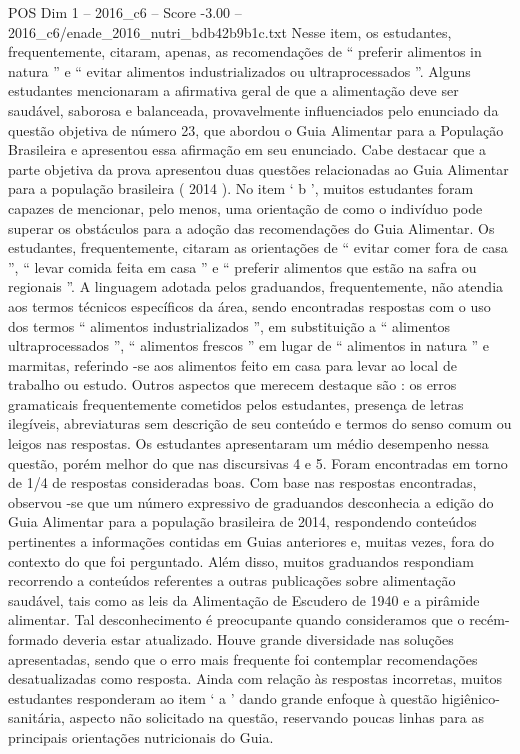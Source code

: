 \begin{textsample}{POS Dim 1 – 2016\_c6 – Score -3.00 – 2016\_c6/enade\_2016\_nutri\_bdb42b9b1c.txt}
Nesse item, os estudantes, frequentemente, citaram, apenas, as recomendações de “ preferir alimentos in natura ” e “ evitar alimentos industrializados ou ultraprocessados ”.
Alguns estudantes mencionaram a afirmativa geral de que a alimentação deve ser saudável, saborosa e balanceada, provavelmente influenciados pelo enunciado da questão objetiva de número 23, que abordou o Guia Alimentar para a População Brasileira e apresentou essa afirmação em seu enunciado.
Cabe destacar que a parte objetiva da prova apresentou duas questões relacionadas ao Guia Alimentar para a população brasileira ( 2014 ).
No item ‘ b ’, muitos estudantes foram capazes de mencionar, pelo menos, uma orientação de como o indivíduo pode superar os obstáculos para a adoção das recomendações do Guia Alimentar.
Os estudantes, frequentemente, citaram as orientações de “ evitar comer fora de casa ”, “ levar comida feita em casa ” e “ preferir alimentos que estão na safra ou regionais ”.
A linguagem adotada pelos graduandos, frequentemente, não atendia aos termos técnicos específicos da área, sendo encontradas respostas com o uso dos termos “ alimentos industrializados ”, em substituição a “ alimentos ultraprocessados ”, “ alimentos frescos ” em lugar de “ alimentos in natura ” e marmitas, referindo -se aos alimentos feito em casa para levar ao local de trabalho ou estudo.
Outros aspectos que merecem destaque são : os erros gramaticais frequentemente cometidos pelos estudantes, presença de letras ilegíveis, abreviaturas sem descrição de seu conteúdo e termos do senso comum ou leigos nas respostas.
Os estudantes apresentaram um médio desempenho nessa questão, porém melhor do que nas discursivas 4 e 5.
Foram encontradas em torno de 1/4 de respostas consideradas boas.
Com base nas respostas encontradas, observou -se que um número expressivo de graduandos desconhecia a edição do Guia Alimentar para a população brasileira de 2014, respondendo conteúdos pertinentes a informações contidas em Guias anteriores e, muitas vezes, fora do contexto do que foi perguntado.
Além disso, muitos graduandos respondiam recorrendo a conteúdos referentes a outras publicações sobre alimentação saudável, tais como as leis da Alimentação de Escudero de 1940 e a pirâmide alimentar.
Tal desconhecimento é preocupante quando consideramos que o recém-formado deveria estar atualizado.
Houve grande diversidade nas soluções apresentadas, sendo que o erro mais frequente foi contemplar recomendações desatualizadas como resposta.
Ainda com relação às respostas incorretas, muitos estudantes responderam ao item ‘ a ’ dando grande enfoque à questão higiênico-sanitária, aspecto não solicitado na questão, reservando poucas linhas para as principais orientações nutricionais do Guia.

\end{textsample}
